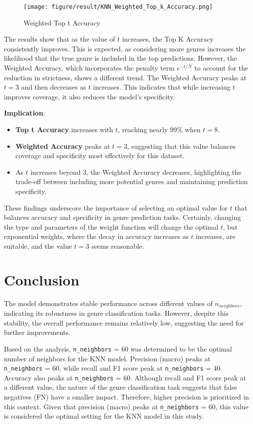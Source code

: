 \documentclass[times, twocolumn]{article}
\begin{document}
\begin{figure}[H]
    \centering
    \texttt{[image: figure/result/KNN\_Weighted\_Top\_k\_Accuracy.png]}
    \caption{Weighted Top t Accuracy}
    \label{fig:weighted_top_t_accuracy}
\end{figure}

The results show that as the value of $t$ increases, the Top K Accuracy consistently improves. This is expected, as considering more genres increases the likelihood that the true genre is included in the top predictions. However, the Weighted Accuracy, which incorporates the penalty term $e^{-t/N}$ to account for the reduction in strictness, shows a different trend. The Weighted Accuracy peaks at $t = 3$ and then decreases as $t$ increases. This indicates that while increasing $t$ improves coverage, it also reduces the model's specificity.

\textbf{Implication}:
\begin{itemize}
    \item \textbf{Top t Accuracy} increases with $t$, reaching nearly 99\% when $t = 8$.
    \item \textbf{Weighted Accuracy} peaks at $t = 3$, suggesting that this value balances coverage and specificity most effectively for this dataset.
    \item As $t$ increases beyond 3, the Weighted Accuracy decreases, highlighting the trade-off between including more potential genres and maintaining prediction specificity.
\end{itemize}

These findings underscore the importance of selecting an optimal value for $t$ that balances accuracy and specificity in genre prediction tasks. Certainly, changing the type and parameters of the weight function will change the optimal $t$, but exponential weights, where the decay in accuracy increases as $t$ increases, are suitable, and the value $t=3$ seems reasonable.

\section{Conclusion}
The model demonstrates stable performance across different values of $n_{neighbors}$, indicating its robustness in genre classification tasks. However, despite this stability, the overall performance remains relatively low, suggesting the need for further improvements.

Based on the analysis, \verb|n_neighbors| = 60 was determined to be the optimal number of neighbors for the KNN model. Precision (macro) peaks at \verb|n_neighbors| = 60, while recall and F1 score peak at \verb|n_neighbors| = 40. Accuracy also peaks at \verb|n_neighbors| = 60. Although recall and F1 score peak at a different value, the nature of the genre classification task suggests that false negatives (FN) have a smaller impact. Therefore, higher precision is prioritized in this context. Given that precision (macro) peaks at \verb|n_neighbors| = 60, this value is considered the optimal setting for the KNN model in this study.
\end{document}
